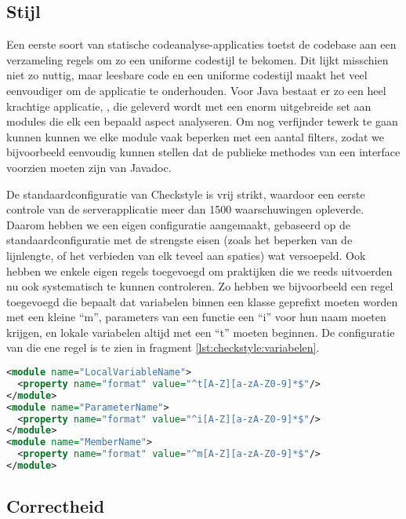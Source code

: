 \subsection{Stijl}

Een eerste soort van statische codeanalyse-applicaties toetst de codebase aan een verzameling regels om zo een uniforme codestijl te bekomen. Dit lijkt misschien niet zo nuttig, maar leesbare code en een uniforme codestijl maakt het veel eenvoudiger om de applicatie te onderhouden.
Voor Java bestaat er zo een heel krachtige applicatie, , die geleverd wordt met een enorm uitgebreide set aan modules die elk een bepaald aspect analyseren. Om nog verfijnder tewerk te gaan kunnen kunnen we elke module vaak beperken met een aantal filters, zodat we bijvoorbeeld eenvoudig kunnen stellen dat de publieke methodes van een interface voorzien moeten zijn van Javadoc.

De standaardconfiguratie van Checkstyle is vrij strikt, waardoor een eerste controle van de serverapplicatie meer dan 1500 waarschuwingen opleverde. Daarom hebben we een eigen configuratie aangemaakt, gebaseerd op de standaardconfiguratie met de strengste eisen (zoals het beperken van de lijnlengte, of het verbieden van elk teveel aan spaties) wat versoepeld. Ook hebben we enkele eigen regels toegevoegd om praktijken die we reeds uitvoerden nu ook systematisch te kunnen controleren. Zo hebben we bijvoorbeeld een regel toegevoegd die bepaalt dat variabelen binnen een klasse geprefixt moeten worden met een kleine ``m'', parameters van een functie een ``i'' voor hun naam moeten krijgen, en lokale variabelen altijd met een ``t'' moeten beginnen. De configuratie van die ene regel is te zien in fragment \ref{lst:checkstyle:variabelen}.

\begin{lstlisting}[language=XML, float, caption="Checkstyle configuratie voor de naamgeving van variabelen., label=lst:checkstyle:variabelen]
<module name="LocalVariableName">
  <property name="format" value="^t[A-Z][a-zA-Z0-9]*$"/>
</module>
<module name="ParameterName">
  <property name="format" value="^i[A-Z][a-zA-Z0-9]*$"/>
</module>
<module name="MemberName">
  <property name="format" value="^m[A-Z][a-zA-Z0-9]*$"/>
</module>
\end{lstlisting}

\subsection{Correctheid}

